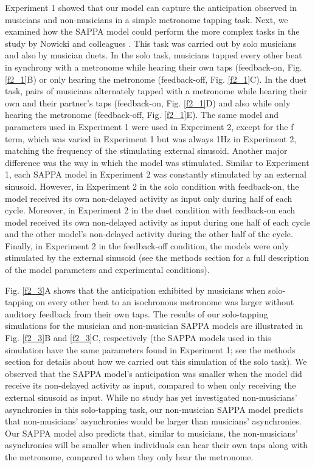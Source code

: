\documentclass{report}
\begin{document}
Experiment 1 showed that our model can capture the anticipation observed in musicians and non-musicians in a simple metronome tapping task. Next, we examined how the SAPPA model could perform the more complex tasks in the study by Nowicki and colleagues \cite{nowicki2013mutual}. This task was carried out by solo musicians and also by musician duets. In the solo task, musicians tapped every other beat in synchrony with a metronome while hearing their own taps (feedback-on, Fig.{} \ref{f2_1}B) or only hearing the metronome (feedback-off, Fig.{} \ref{f2_1}C). In the duet task, pairs of musicians alternately tapped with a metronome while hearing their own and their partner's taps (feedback-on, Fig.{} \ref{f2_1}D) and also while only hearing the metronome (feedback-off, Fig.{} \ref{f2_1}E). The same model and parameters used in Experiment 1 were used in Experiment 2, except for the f term, which was varied in Experiment 1 but was always 1Hz in Experiment 2, matching the frequency of the stimulating external sinusoid. Another major difference was the way in which the model was stimulated. Similar to Experiment 1, each SAPPA model in Experiment 2 was constantly stimulated by an external sinusoid. However, in Experiment 2 in the solo condition with feedback-on, the model received its own non-delayed activity as input only during half of each cycle. Moreover, in Experiment 2 in the duet condition with feedback-on each model received its own non-delayed activity as input during one half of each cycle and the other model's non-delayed activity during the other half of the cycle. Finally, in Experiment 2 in the feedback-off condition, the models were only stimulated by the external sinusoid (see the methods section for a full description of the model parameters and experimental conditions).

Fig.{} \ref{f2_3}A shows that the anticipation exhibited by musicians when solo-tapping on every other beat to an isochronous metronome was larger without auditory feedback from their own taps. The results of our solo-tapping simulations for the musician and non-musician SAPPA models are illustrated in Fig.{} \ref{f2_3}B and \ref{f2_3}C, respectively (the SAPPA models used in this simulation have the same parameters found in Experiment 1; see the methods section for details about how we carried out this simulation of the solo task). We observed that the SAPPA model's anticipation was smaller when the model did receive its non-delayed activity as input, compared to when only receiving the external sinusoid as input. While no study has yet investigated non-musicians' asynchronies in this solo-tapping task, our non-musician SAPPA model predicts that non-musicians' asynchronies would be larger than musicians' asynchronies. Our SAPPA model also predicts that, similar to musicians, the non-musicians' asynchronies will be smaller when individuals can hear their own taps along with the metronome, compared to when they only hear the metronome.
\end{document}
